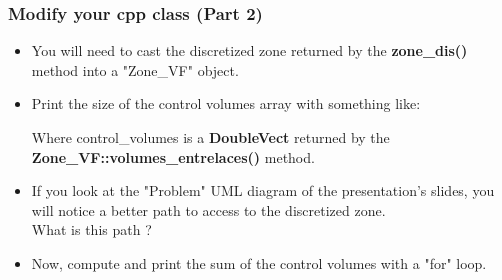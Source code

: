\documentclass[10pt, hyperref={unicode=true,pdfusetitle, bookmarks=true,bookmarksnumbered=false,bookmarksopen=false, breaklinks=false,pdfborder={0 0 1},backref=true,colorlinks=true,linkcolor=darkblue,pageanchor, urlcolor=darkblue}]{beamer}
\begin{document}
\begin{frame}
\frametitle{Modify your cpp class (Part 2)}
\begin{block}{}

\begin{itemize}
\item You will need to cast the discretized zone returned by the \textbf{zone\_dis()} method into a "Zone\_VF" object.

\item Print the size of the control volumes array with something like:
\begin{center}
\end{center}

Where control\_volumes is a \textbf{DoubleVect} returned by the \textbf{Zone\_VF::volumes\_entrelaces()} method.
\item If you look at the "Problem" UML diagram of the presentation's slides, you will notice a better path to access to the discretized zone. \\
 What is this path ?
\item Now, compute and print the sum of the control volumes with a "for" loop.

\end{itemize}

\end{block}
\end{frame}
\end{document}
